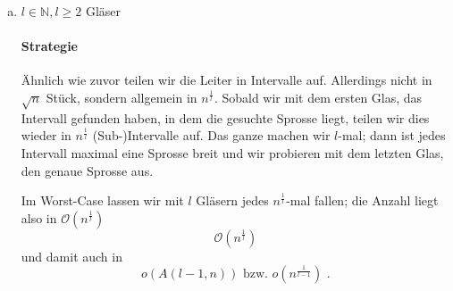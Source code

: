 \documentclass[a4paper]{scrartcl}
\begin{document}
\begin{enumerate}[(a)]








    \item $l \in \mathbb{N}, l \geq 2$ Gläser
        \paragraph{Strategie}
        Ähnlich wie zuvor teilen wir die Leiter in Intervalle auf.
        Allerdings nicht in $\sqrt{n}$ Stück, sondern allgemein in
        $n^\frac{1}{l}$.
        Sobald wir mit dem ersten Glas, das Intervall gefunden haben, in dem
        die gesuchte Sprosse liegt, teilen wir dies wieder in $n^\frac{1}{l}$
        (Sub-)Intervalle auf.
        Das ganze machen wir $l$-mal; dann ist jedes Intervall maximal eine
        Sprosse breit und wir probieren mit dem letzten Glas, den genaue Sprosse
        aus.

        Im Worst-Case lassen wir mit $l$ Gläsern jedes $n^\frac{1}{l}$-mal
        fallen; die Anzahl liegt also in
        $\mathcal{O}(n^\frac{1}{l})$
        \begin{equation}
            \mathcal{O} \left( n^\frac{1}{l} \right)
        \end{equation}
        und damit auch in
        \begin{equation}
            o \left( A(l-1, n) \right) \text{ bzw. } o \left( n^\frac{1}{l-1} \right) \text{ .}
        \end{equation}
        

\end{enumerate}
\end{document}
